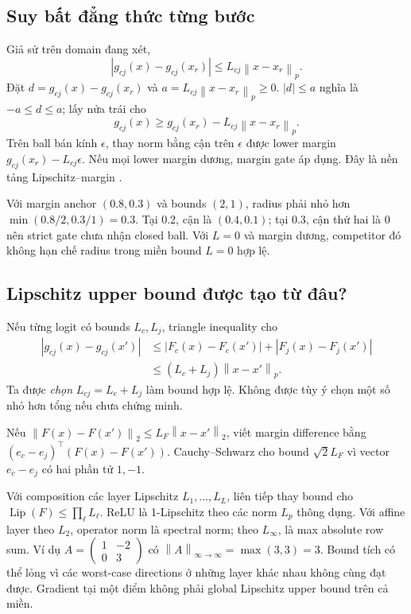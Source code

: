 \documentclass[11pt,a4paper]{article}
\newcommand{\norm}[1]{\left\lVert#1\right\rVert}
\theoremstyle{definition}
\begin{document}
\subsection{Suy bất đẳng thức từng bước}
Giả sử trên domain đang xét,
\begin{equation}
|g_{cj}(x)-g_{cj}(x_r)|\le L_{cj}\norm{x-x_r}_p.
\end{equation}
Đặt $d=g_{cj}(x)-g_{cj}(x_r)$ và $a=L_{cj}\norm{x-x_r}_p\ge0$.
$|d|\le a$ nghĩa là $-a\le d\le a$; lấy nửa trái cho
\begin{equation}
g_{cj}(x)\ge g_{cj}(x_r)-L_{cj}\norm{x-x_r}_p.
\end{equation}
Trên ball bán kính $\epsilon$, thay norm bằng cận trên $\epsilon$ được
lower margin $g_{cj}(x_r)-L_{cj}\epsilon$. Nếu mọi lower margin dương,
margin gate áp dụng. Đây là nền tảng Lipschitz--margin \cite{lmt}.

Với margin anchor $(0.8,0.3)$ và bounds $(2,1)$, radius phải nhỏ hơn
$\min(0.8/2,0.3/1)=0.3$. Tại 0.2, cận là $(0.4,0.1)$; tại 0.3, cận
thứ hai là 0 nên strict gate chưa nhận closed ball. Với $L=0$ và margin
dương, competitor đó không hạn chế radius trong miền bound $L=0$ hợp lệ.

\subsection{Lipschitz upper bound được tạo từ đâu?}
Nếu từng logit có bounds $L_c,L_j$, triangle inequality cho
\begin{align}
|g_{cj}(x)-g_{cj}(x')|
&\le|F_c(x)-F_c(x')|+|F_j(x)-F_j(x')|\\
&\le(L_c+L_j)\norm{x-x'}_p.
\end{align}
Ta được \emph{chọn} $L_{cj}=L_c+L_j$ làm bound hợp lệ. Không được tùy ý
chọn một số nhỏ hơn tổng nếu chưa chứng minh.

Nếu $\norm{F(x)-F(x')}_2\le L_F\norm{x-x'}_2$, viết margin difference
bằng $(e_c-e_j)^\top(F(x)-F(x'))$. Cauchy--Schwarz cho bound
$\sqrt2L_F$ vì vector $e_c-e_j$ có hai phần tử $1,-1$.

Với composition các layer Lipschitz $L_1,\ldots,L_L$, liên tiếp thay
bound cho $\operatorname{Lip}(F)\le\prod_\ell L_\ell$. ReLU là
1-Lipschitz theo các norm $L_p$ thông dụng. Với affine layer theo $L_2$,
operator norm là spectral norm; theo $L_\infty$, là max absolute row sum.
Ví dụ $A=\left(\begin{smallmatrix}1&-2\\0&3\end{smallmatrix}\right)$ có
$\norm{A}_{\infty\to\infty}=\max(3,3)=3$. Bound tích có thể lỏng vì các
worst-case directions ở những layer khác nhau không cùng đạt được.
Gradient tại một điểm không phải global Lipschitz upper bound trên cả miền.
\end{document}
